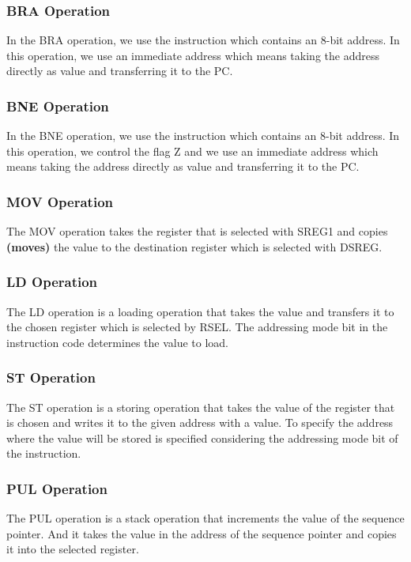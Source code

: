 \documentclass[pdftex,12pt,a4paper]{article}
\begin{document}
\subsubsection{\textbf{BRA} Operation}
In the BRA operation, we use the instruction which contains an 8-bit address. In this operation, we use an immediate address which means taking the address directly as value and transferring it to the PC. 

\subsubsection{\textbf{BNE} Operation}
In the BNE operation, we use the instruction which contains an 8-bit address. In this operation, we control the flag Z and we use an immediate address which means taking the address directly as value and transferring it to the PC. 

\subsubsection{\textbf{MOV} Operation}
The MOV operation takes the register that is selected with SREG1 and copies \textbf{(moves)} the value to the destination register which is selected with DSREG.

\subsubsection{\textbf{LD} Operation}
The LD operation is a loading operation that takes the value and transfers it to the chosen register which is selected by RSEL. The addressing mode bit in the instruction code determines the value to load. 

\subsubsection{\textbf{ST} Operation}
The ST operation is a storing operation that takes the value of the register that is chosen and writes it to the given address with a value. To specify the address where the value will be stored is specified considering the addressing mode bit of the instruction. 

\subsubsection{\textbf{PUL} Operation}
The PUL operation is a stack operation that increments the value of the sequence pointer. And it takes the value in the address of the sequence pointer and copies it into the selected register.
\end{document}
